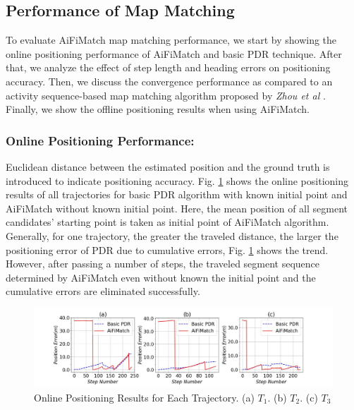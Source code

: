 \documentclass{llncs}
\begin{document}
\subsection{Performance of Map Matching}

To evaluate AiFiMatch map matching performance, we start by showing the online positioning performance of AiFiMatch and basic PDR technique. After that, we analyze the effect of step length and heading errors on positioning accuracy. Then, we discuss the convergence performance as compared to an activity sequence-based map matching algorithm proposed by \emph{Zhou et al} \cite{zhou2015activity}. Finally, we show the offline positioning results when using AiFiMatch.

\subsubsection{Online Positioning Performance:}

Euclidean distance between the estimated position and the ground truth is introduced to indicate positioning accuracy.  Fig. \ref{fig-online} shows the online positioning results of all trajectories for basic PDR algorithm with known initial point and AiFiMatch without known initial point.  Here, the mean position of all segment candidates' starting point is taken as initial point of AiFiMatch algorithm. Generally, for one trajectory, the greater the traveled distance, the larger the positioning error of PDR due to cumulative errors, Fig. \ref{fig-online} shows the trend.  However, after passing a number of steps, the traveled segment sequence determined by AiFiMatch even without known the initial point and the cumulative  errors are eliminated successfully.

\vspace{-10pt}
\begin{figure}[!htbp]
	\centering
	\includegraphics[width=4.8in]{AiFiMatch-OnlinePosition}
	\caption{Online Positioning Results for Each Trajectory. (a) $T_1$. (b) $T_2$. (c) $T_3$}
	\label{fig-online}
\end{figure}
\vspace{-10pt}
\end{document}
